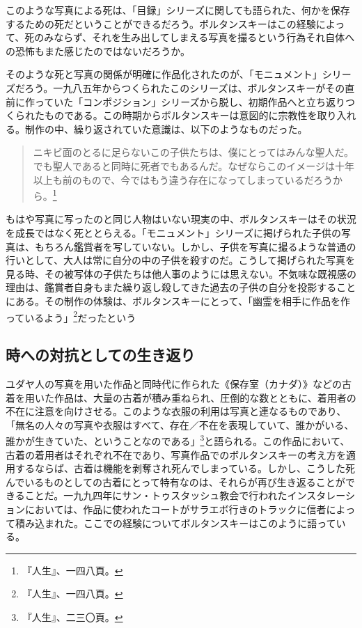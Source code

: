 \documentclass[b5j,twoside,twocolumn]{utarticle}
\begin{document}
このような写真による死は、「目録」シリーズに関しても語られた、何かを保存するための死だということができるだろう。ボルタンスキーはこの経験によって、死のみならず、それを生み出してしまえる写真を撮るという行為それ自体への恐怖もまた感じたのではないだろうか。


そのような死と写真の関係が明確に作品化されたのが、「モニュメント」シリーズだろう。一九八五年からつくられたこのシリーズは、ボルタンスキーがその直前に作っていた「コンポジション」シリーズから脱し、初期作品へと立ち返りつくられたものである。この時期からボルタンスキーは意図的に宗教性を取り入れる。制作の中、繰り返されていた意識は、以下のようなものだった。
\begin{quote}
ニキビ面のとるに足らないこの子供たちは、僕にとってはみんな聖人だ。でも聖人であると同時に死者でもあるんだ。なぜならこのイメージは十年以上も前のもので、今ではもう違う存在になってしまっているだろうから。\footnote{『人生』、一四八頁。}
\end{quote}


もはや写真に写ったのと同じ人物はいない現実の中、ボルタンスキーはその状況を成長ではなく死ととらえる。「モニュメント」シリーズに掲げられた子供の写真は、もちろん鑑賞者を写していない。しかし、子供を写真に撮るような普通の行いとして、大人は常に自分の中の子供を殺すのだ。こうして掲げられた写真を見る時、その被写体の子供たちは他人事のようには思えない。不気味な既視感の理由は、鑑賞者自身もまた繰り返し殺してきた過去の子供の自分を投影することにある。その制作の体験は、ボルタンスキーにとって、「幽霊を相手に作品を作っているよう」\footnote{『人生』、一四八頁。}だったという

\subsection{時への対抗としての生き返り}
ユダヤ人の写真を用いた作品と同時代に作られた《保存室（カナダ）》などの古着を用いた作品は、大量の古着が積み重ねられ、圧倒的な数とともに、着用者の不在に注意を向けさせる。このような衣服の利用は写真と連なるものであり、「無名の人々の写真や衣服はすべて、存在／不在を表現していて、誰かがいる、誰かが生きていた、ということなのである」\footnote{『人生』、二三〇頁。}と語られる。この作品において、古着の着用者はそれぞれ不在であり、写真作品でのボルタンスキーの考え方を適用するならば、古着は機能を剥奪され死んでしまっている。しかし、こうした死んでいるものとしての古着にとって特有なのは、それらが再び生き返ることができることだ。一九九四年にサン・トゥスタッシュ教会で行われたインスタレーションにおいては、作品に使われたコートがサラエボ行きのトラックに信者によって積み込まれた。ここでの経験についてボルタンスキーはこのように語っている。
\end{document}
